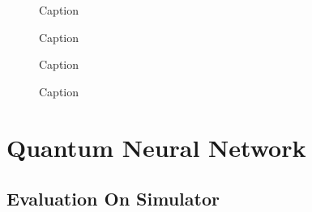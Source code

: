 \begin{figure}
    \centering
    \scalebox{0.8}{
        
    }
    \caption{Caption}
    \label{figure:noml_sim_distance}
\end{figure}

\begin{figure}
    \centering
    \scalebox{0.8}{
        
    }
    \caption{Caption}
    \label{figure:noml_rhw_dist}
\end{figure}

\begin{figure}
    \centering
    \scalebox{0.8}{
        
    }
    \caption{Caption}
    \label{figure:ml_sim_dist}
\end{figure}

\begin{figure}
    \centering
    \scalebox{0.8}{
        
    }
    \caption{Caption}
    \label{figure:ml_rhw_dist}
\end{figure}

\newpage

\section{Quantum Neural Network}

\subsection{Evaluation On Simulator}

